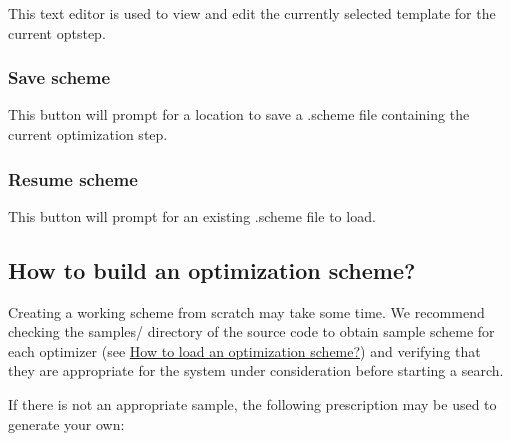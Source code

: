 This text editor is used to view and edit the currently selected template for the current optstep.\hypertarget{optschemes_gui-save}{}\subsubsection{Save scheme}\label{optschemes_gui-save}
This button will prompt for a location to save a .scheme file containing the current optimization step.\hypertarget{optschemes_gui-load}{}\subsubsection{Resume scheme}\label{optschemes_gui-load}
This button will prompt for an existing .scheme file to load.\hypertarget{optschemes_creating}{}\subsection{How to build an optimization scheme?}\label{optschemes_creating}
Creating a working scheme from scratch may take some time. We recommend checking the samples/ directory of the source code to obtain sample scheme for each optimizer (see \hyperlink{optschemes_loading}{How to load an optimization scheme?}) and verifying that they are appropriate for the system under consideration before starting a search.

If there is not an appropriate sample, the following prescription may be used to generate your own\+:


